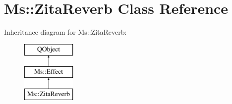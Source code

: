 \hypertarget{class_ms_1_1_zita_reverb}{}\section{Ms\+:\+:Zita\+Reverb Class Reference}
\label{class_ms_1_1_zita_reverb}
Inheritance diagram for Ms\+:\+:Zita\+Reverb\+:\begin{figure}[H]
\begin{center}
\leavevmode
\includegraphics[height=3.000000cm]{class_ms_1_1_zita_reverb}
\end{center}
\end{figure}
